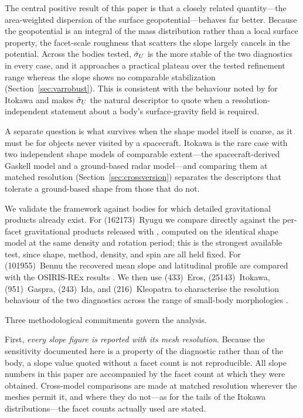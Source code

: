 The central positive result of this paper is that a closely related
quantity---the area-weighted dispersion of the surface geopotential---behaves far
better. Because the geopotential is an integral of the mass distribution rather
than a local surface property, the facet-scale roughness that scatters the slope
largely cancels in the potential. Across the bodies tested, $\tilde{\sigma}_{U}$ is the
more stable of the two diagnostics in every case, and it approaches a practical
plateau over the tested refinement range whereas the slope shows no comparable
stabilization (Section~\ref{sec:varrobust}). This is
consistent with the behaviour noted by \citet{kanamaru2019} for Itokawa and
makes $\tilde{\sigma}_{U}$ the natural descriptor to quote when a resolution-independent
statement about a body's surface-gravity field is required.

A separate question is what survives when the shape model itself is coarse, as
it must be for objects never visited by a spacecraft. Itokawa is the rare case
with two independent shape models of comparable extent---the spacecraft-derived
Gaskell model and a ground-based radar model---and comparing them at matched
resolution (Section~\ref{sec:crossversion}) separates the descriptors that
tolerate a ground-based shape from those that do not.

We validate the framework against bodies for which detailed gravitational
products already exist. For (162173)~Ryugu we compare directly against the
per-facet gravitational products released with \citet{kanamaru2019}, computed on
the identical shape model at the same density and rotation period; this is the
strongest available test, since shape, method, density, and spin are all held
fixed. For (101955)~Bennu the recovered mean slope and latitudinal profile are
compared with the OSIRIS-REx results
\citep{scheeres2019,barnouin2020,jawin2020}. We then use (433)~Eros,
(25143)~Itokawa, (951)~Gaspra, (243)~Ida, and (216)~Kleopatra to characterise
the resolution behaviour of the two diagnostics across the range of small-body
morphologies \citep{zuber2000,thomas2002,fujiwara2006,abe2006}.

\medskip
Three methodological commitments govern the analysis.

First, \emph{every slope figure is reported with its mesh resolution}. Because
the sensitivity documented here is a property of the diagnostic rather than of
the body, a slope value quoted without a facet count is not reproducible. All
slope numbers in this paper are accompanied by the facet count at which they
were obtained. Cross-model comparisons are made at matched resolution wherever
the meshes permit it, and where they do not---as for the tails of the Itokawa
distributions---the facet counts actually used are stated.

